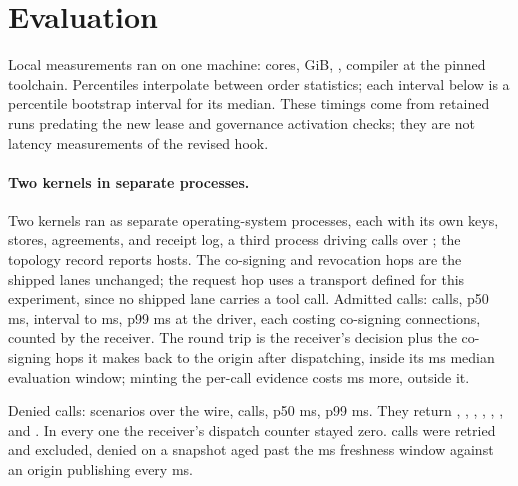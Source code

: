 \section{Evaluation}
\label{sec:eval}

Local measurements ran on one machine: \PSHostCores{} \PSHostCpuModel{} cores,
\PSHostMemoryGiB{} GiB, \PSHostOs{}, compiler \PSRustcVersion{} at the pinned
toolchain. Percentiles interpolate between order statistics; each interval
below is a percentile bootstrap interval for its median.
These timings come from retained runs predating the new lease and governance
activation checks; they are not latency measurements of the revised hook.

\paragraph{Two kernels in separate processes.}
Two kernels ran as separate operating-system processes, each with its own keys,
stores, agreements, and receipt log, a third process driving calls over
\PSFedTransport{}; the topology record reports \PSFedHosts{} hosts.
The co-signing and revocation hops are the shipped lanes unchanged; the request
hop uses a transport defined for this experiment, since no shipped lane carries
a tool call. Admitted calls: \PSFedAllowSampleCount{}
calls, p50 \PSFedAllowPFiftyMs{} ms, interval \PSFedAllowCiLowMs{} to
\PSFedAllowCiHighMs{} ms, p99 \PSFedAllowPNinetyNineMs{} ms at the driver, each
costing \PSFedCosignConnections{} co-signing connections, counted by the
receiver. The round trip is the receiver's decision plus the co-signing hops it
makes back to the origin after dispatching, inside its
\PSFedReceiverEvalPFiftyMs{} ms median evaluation window; minting the per-call
evidence costs \PSFedEvidencePrepPFiftyMs{} ms more, outside it.

Denied calls: \PSFedDenyCases{} scenarios over the wire,
\PSFedDenySampleCount{} calls, p50 \PSFedDenyPFiftyMs{} ms, p99
\PSFedDenyPNinetyNineMs{} ms. They return ,
,
,
,
,
, and
. In every one the receiver's dispatch
counter stayed zero. \PSFedAbsorbedCount{} calls were retried and excluded, denied on a snapshot aged
past the \PSFreshnessMs{} ms freshness window against an origin publishing
every \PSEpochTickMs{} ms.

